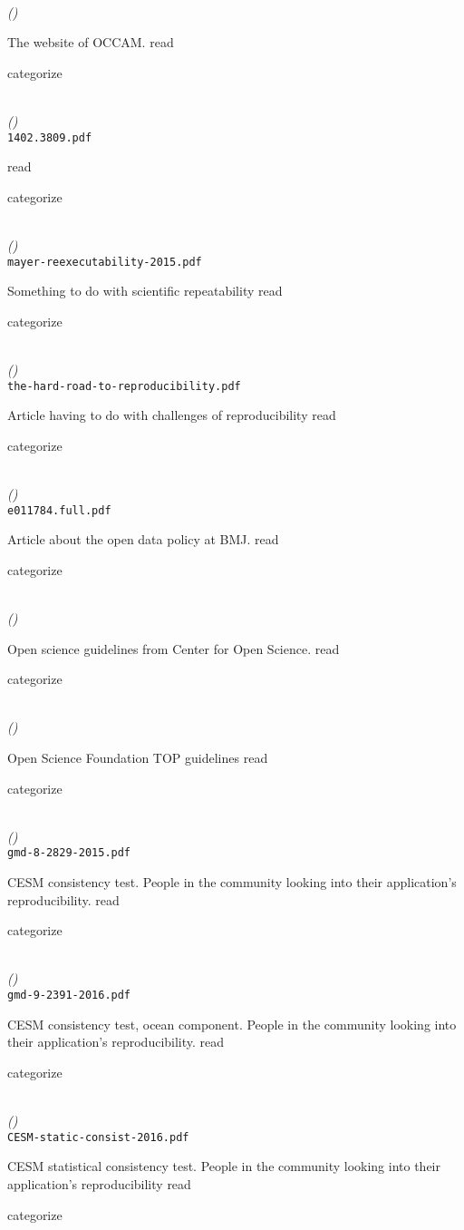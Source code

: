 \documentclass{article}
\newcommand{\Read}{
	\gls{read}
}
\newcommand{\categorize}{
	\gls{categorize}
}
\newenvironment{refdef}[2] {
	\noindent \textbf{\citetitle{#1}} \cite{#1}\\ \citejournalorbooktitle{#1} \textit{(\citeyear{#1})}\\ \texttt{#2} \vspace{0.2in} \par 
} {
\vspace{0.2in}
}
\begin{document}
\begin{refdef}{occam-cs-pitt}{}
The website of OCCAM. \Read \categorize
\end{refdef}

\begin{refdef}{heroux-resilient-algorithms}{1402.3809.pdf}
\Read \categorize
\end{refdef}

\begin{refdef}{mayer-reexecutability-2015}{mayer-reexecutability-2015.pdf}
Something to do with scientific repeatability \Read \categorize
\end{refdef}

\begin{refdef}{Barba142}{the-hard-road-to-reproducibility.pdf}
Article having to do with challenges of reproducibility \Read \categorize
\end{refdef}

\begin{refdef}{open-data-bmj-2016}{e011784.full.pdf}
Article about the open data policy at BMJ. \Read \categorize
\end{refdef}

\begin{refdef}{cos-top-guidelines}{}
Open science guidelines from Center for Open Science. \Read \categorize
\end{refdef}

\begin{refdef}{osf-transparency-top-guidelines}{}
Open Science Foundation TOP guidelines \Read \categorize
\end{refdef}

\begin{refdef}{CESM-stat-consist-ocean-2015}{gmd-8-2829-2015.pdf}
CESM consistency test. People in the community looking into their application's reproducibility. \Read \categorize
\end{refdef}

\begin{refdef}{CESM-stat-consist-ocean-2016}{gmd-9-2391-2016.pdf}
CESM consistency test, ocean component. People in the community looking into their application's reproducibility. \Read \categorize
\end{refdef}

\begin{refdef}{CESM-static-consist-2016}{CESM-static-consist-2016.pdf}
CESM statistical consistency test. People in the community looking into their application's reproducibility \Read \categorize
\end{refdef}
\end{document}
